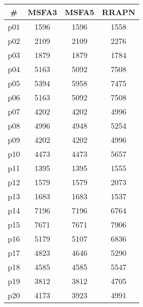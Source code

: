 \begin{tabular}{cccc}
\toprule
\textbf{\#} & \textbf{MSFA3} & \textbf{MSFA5} & \textbf{RRAPN}\\
\midrule
p01 & 1596 & 1596 & 1558\\
p02 & 2109 & 2109 & 2276\\
p03 & 1879 & 1879 & 1784\\
p04 & 5163 & 5092 & 7508\\
p05 & 5394 & 5958 & 7475\\
p06 & 5163 & 5092 & 7508\\
p07 & 4202 & 4202 & 4996\\
p08 & 4996 & 4948 & 5254\\
p09 & 4202 & 4202 & 4996\\
p10 & 4473 & 4473 & 5657\\
p11 & 1395 & 1395 & 1555\\
p12 & 1579 & 1579 & 2073\\
p13 & 1683 & 1683 & 1537\\
p14 & 7196 & 7196 & 6764\\
p15 & 7671 & 7671 & 7906\\
p16 & 5179 & 5107 & 6836\\
p17 & 4823 & 4646 & 5290\\
p18 & 4585 & 4585 & 5547\\
p19 & 3812 & 3812 & 4705\\
p20 & 4173 & 3923 & 4991\\
\bottomrule
\end{tabular}

